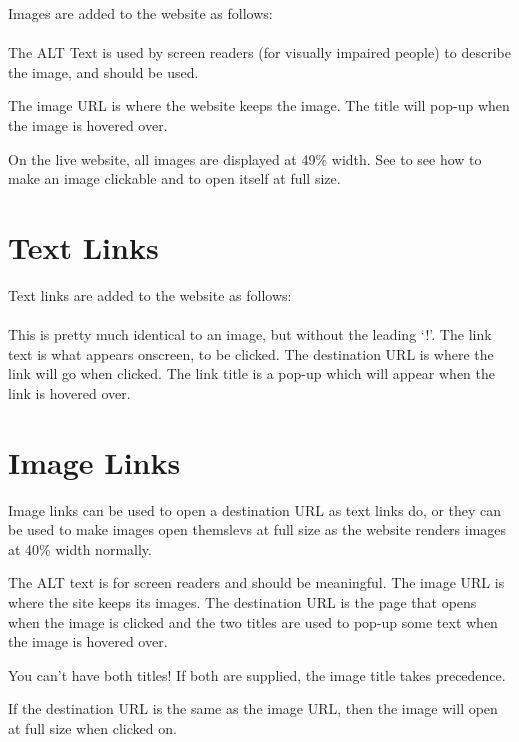 Images are added to the website as follows:\\

\noindent{}\\

The ALT Text is used by screen readers (for visually impaired people) to describe the image, and should be used.

The image URL is where the website keeps the image. The title will pop-up when the image is hovered over.

On the live website, all images are displayed at 49\% width. See  to see how to make an image clickable and to open itself at full size.

\section{Text Links}

Text links are added to the website as follows:\\

\noindent{}\\

This is pretty much identical to an image, but without the leading `!'. The link text is what appears onscreen, to be clicked. The destination URL is where the link will go when clicked. The link title is a pop-up which will appear when the link is hovered over.

\section{Image Links}\label{sect: Image Links below}

Image links can be used to open a destination URL as text links do, or they can be used to make images open themslevs at full size as the website renders images at 40\% width normally.\\

\noindent{}

The ALT text is for screen readers and should be meaningful. The image URL is where the site keeps its images. The destination URL is the page that opens when the image is clicked and the two titles are used to pop-up some text when the image is hovered over.

You can't have both titles! If both are supplied, the image title takes precedence.

If the destination URL is the same as the image URL, then the image will open at full size when clicked on.